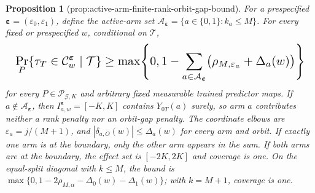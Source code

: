 \documentclass{article}
\newtheorem{proposition}{Proposition}
\begin{document}
\begin{proposition}[prop:active-arm-finite-rank-orbit-gap-bound]\label{prop:active-arm-finite-rank-orbit-gap-bound}
For a prespecified \(\boldsymbol\varepsilon=(\varepsilon_0,\varepsilon_1)\), define the active-arm set \(\mathcal A_{\boldsymbol\varepsilon}=\{a\in\{0,1\}:k_a\le M\}\). For every fixed or prespecified \(w\), conditional on \(\mathcal T\),
\[
\makebox[\linewidth][c]{\resizebox{0.98\linewidth}{!}{\(\displaystyle \Pr_P\!\left\{\tau_T\in\mathcal C^{\boldsymbol\varepsilon}_w\mid\mathcal T\right\}
\ge
\max\!\left\{0,1-\sum_{a\in\mathcal A_{\boldsymbol\varepsilon}}\bigl(\rho_{M,\varepsilon_a}+\Delta_a(w)\bigr)\right\}\)}}
\]
for every \(P\in\mathcal P_{\mathcal G,K}\) and arbitrary fixed measurable trained predictor maps. If \(a\notin\mathcal A_{\boldsymbol\varepsilon}\), then \(I^{\boldsymbol\varepsilon}_{a,w}=[-K,K]\) contains \(Y_{0T}(a)\) surely, so arm \(a\) contributes neither a rank penalty nor an orbit-gap penalty. The coordinate elbows are \(\varepsilon_a=j/(M+1)\), and \(|\delta_{a,O}(w)|\le\Delta_a(w)\) for every arm and orbit. If exactly one arm is at the boundary, only the other arm appears in the sum. If both arms are at the boundary, the effect set is \([-2K,2K]\) and coverage is one. On the equal-split diagonal with \(k\le M\), the bound is \(\max\{0,1-2\rho_{M,\alpha}-\Delta_0(w)-\Delta_1(w)\}\); with \(k=M+1\), coverage is one.
\end{proposition}
\end{document}

